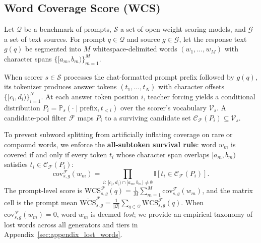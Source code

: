 \documentclass[11pt,a4paper,twocolumn]{article}
\begin{document}
\subsection{Word Coverage Score (WCS)}
Let $\mathcal{Q}$ be a benchmark of prompts, $\mathcal{S}$ a set of open-weight scoring models, and $\mathcal{G}$ a set of text sources. For prompt $q \in \mathcal{Q}$ and source $g \in \mathcal{G}$, let the response text $g(q)$ be segmented into $M$ whitespace-delimited words $(w_1, \dots, w_M)$ with character spans $\{[a_m, b_m)\}_{m=1}^M$.

When scorer $s \in \mathcal{S}$ processes the chat-formatted prompt prefix followed by $g(q)$, its tokenizer produces answer tokens $(t_1, \dots, t_N)$ with character offsets $\{[c_i, d_i)\}_{i=1}^N$. At each answer token position $i$, teacher forcing yields a conditional distribution $P_i = \mathbb{P}_s(\cdot \mid \text{prefix}, t_{<i})$ over the scorer's vocabulary $\mathcal{V}_s$. A candidate-pool filter $\mathcal{F}$ maps $P_i$ to a surviving candidate set $\mathcal{C}_{\mathcal{F}}(P_i) \subseteq \mathcal{V}_s$.

To prevent subword splitting from artificially inflating coverage on rare or compound words, we enforce the \textbf{all-subtoken survival rule}: word $w_m$ is covered if and only if every token $t_i$ whose character span overlaps $[a_m, b_m)$ satisfies $t_i \in \mathcal{C}_{\mathcal{F}}(P_i)$:
\begin{equation}
\text{cov}_{s,g}^{\mathcal{F}}(w_m) = \prod_{i:\, [c_i, d_i) \cap [a_m, b_m) \neq \emptyset} \mathbb{I}\!\left[t_i \in \mathcal{C}_{\mathcal{F}}(P_i)\right].
\end{equation}
The prompt-level score is $\text{WCS}_{s,g}^{\mathcal{F}}(q) = \frac{1}{M}\sum_{m=1}^M \text{cov}_{s,g}^{\mathcal{F}}(w_m)$, and the matrix cell is the prompt mean $\overline{\text{WCS}}_{s,g}^{\mathcal{F}} = \frac{1}{|\mathcal{Q}|}\sum_{q \in \mathcal{Q}} \text{WCS}_{s,g}^{\mathcal{F}}(q)$. When $\text{cov}_{s,g}^{\mathcal{F}}(w_m) = 0$, word $w_m$ is deemed \emph{lost}; we provide an empirical taxonomy of lost words across all generators and tiers in Appendix~\ref{sec:appendix_lost_words}.
\end{document}
